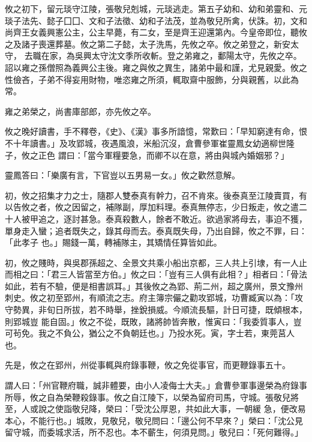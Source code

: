 \begin{pinyinscope}
 攸之初下，留元琰守江陵，張敬兒剋城，元琰逃走。第五子幼和、幼和弟靈和、元琰子法先、懿子囗囗、文和子法徵、幼和子法茂，並為敬兒所禽，伏誅。初，文和尚齊王女義興憲公主，公主早薨，有二女，至是齊王迎還第內。今皇帝即位，聽攸之及諸子喪還葬墓。攸之第二子懿，太子洗馬，先攸之卒。攸之弟登之，新安太守，
 去職在家，為吳興太守沈文季所收斬。登之弟雍之，鄱陽太守，先攸之卒。詔以雍之孫僧照為義興公主後。雍之與攸之異生，諸弟中最和謹，尤見親愛。攸之性儉吝，子弟不得妄用財物，唯恣雍之所須，輒取齋中服飾，分與親舊，以此為常。



 雍之弟榮之，尚書庫部郎，亦先攸之卒。



 攸之晚好讀書，手不釋卷，《史》、《漢》事多所諳憶，常歎曰：「早知窮達有命，恨不十年讀書。」及攻郢城，夜遇風浪，米船沉沒，倉曹參軍崔靈鳳女幼適柳世隆子，攸之正色
 謂曰：「當今軍糧要急，而卿不以在意，將由與城內婚姻邪？」



 靈鳳答曰：「樂廣有言，下官豈以五男易一女。」攸之歡然意解。



 初，攸之招集才力之士，隨郡人雙泰真有幹力，召不肯來。後泰真至江陵賣買，有以告攸之者，攸之因留之，補隊副，厚加料理。泰真無停志，少日叛走，攸之遣二十人被甲追之，逐討甚急。泰真殺數人，餘者不敢近。欲過家將母去，事迫不獲，單身走入蠻；追者既失之，錄其母而去。泰真既失母，乃出自歸，攸之不罪，曰：「此孝子
 也。」賜錢一萬，轉補隊主，其矯情任算皆如此。



 初，攸之賤時，與吳郡孫超之、全景文共乘小船出京都，三人共上引埭，有一人止而相之曰：「君三人皆當至方伯。」攸之曰：「豈有三人俱有此相？」相者曰：「骨法如此，若有不驗，便是相書誤耳。」其後攸之為郢、荊二州，超之廣州，景文豫州刺史。攸之初至郢州，有順流之志。府主簿宗儼之勸攻郢城，功曹臧寅以為：「攻守勢異，非旬日所拔，若不時舉，挫銳損威。今順流長驅，計日可捷，既傾根本，則郢城豈
 能自固。」攸之不從，既敗，諸將帥皆奔散，惟寅曰：「我委質事人，豈可茍免。我之不負公，猶公之不負朝廷也。」乃投水死。寅，字士若，東莞莒人也。



 先是，攸之在郢州，州從事輒與府錄事鞭，攸之免從事官，而更鞭錄事五十。



 謂人曰：「州官鞭府職，誠非體要，由小人凌侮士大夫。」倉曹參軍事邊榮為府錄事所辱，攸之自為榮鞭殺錄事。攸之自江陵下，以榮為留府司馬，守城。張敬兒將至，人或說之使詣敬兒降，榮曰：「受沈公厚恩，共如此大事，一朝緩
 急，便改易本心，不能行也。」城敗，見敬兒，敬兒問曰：「邊公何不早來？」榮曰：「沈公見留守城，而委城求活，所不忍也。本不蘄生，何須見問。」敬兒曰：「死何難得。」




\end{pinyinscope}
